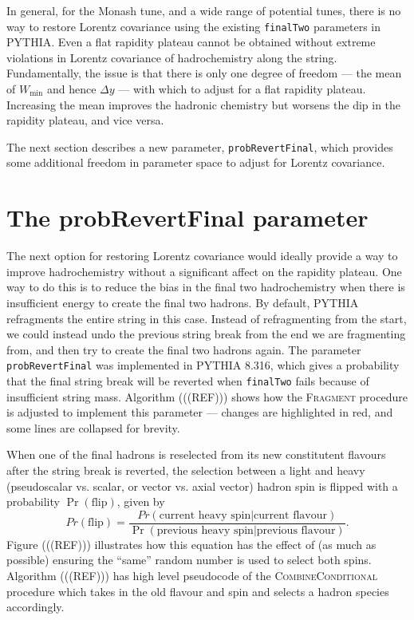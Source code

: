 \documentclass[12pt,a4paper]{report}
\begin{document}
In general, for the Monash tune, and a wide range of potential tunes, there is no way to restore Lorentz covariance using the existing \texttt{finalTwo} parameters in PYTHIA. Even a flat rapidity plateau cannot be obtained without extreme violations in Lorentz covariance of hadrochemistry along the string. Fundamentally, the issue is that there is only one degree of freedom --- the mean of $W_\text{min}$ and hence $\Delta y$ --- with which to adjust for a flat rapidity plateau. Increasing the mean improves the hadronic chemistry but worsens the dip in the rapidity plateau, and vice versa.

The next section describes a new parameter, \texttt{probRevertFinal}, which provides some additional freedom in parameter space to adjust for Lorentz covariance.

\section{The probRevertFinal parameter}
The next option for restoring Lorentz covariance would ideally provide a way to improve hadrochemistry without a significant affect on the rapidity plateau. One way to do this is to reduce the bias in the final two hadrochemistry when there is insufficient energy to create the final two hadrons. By default, PYTHIA refragments the entire string in this case. Instead of refragmenting from the start, we could instead undo the previous string break from the end we are fragmenting from, and then try to create the final two hadrons again. The parameter \texttt{probRevertFinal} was implemented in PYTHIA 8.316, which gives a probability that the final string break will be reverted when \texttt{finalTwo} fails because of insufficient string mass. Algorithm (((REF))) shows how the \textsc{Fragment} procedure is adjusted to implement this parameter --- changes are highlighted in red, and some lines are collapsed for brevity.

When one of the final hadrons is reselected from its new constitutent flavours after the string break is reverted, the selection between a light and heavy (pseudoscalar vs. scalar, or vector vs. axial vector) hadron spin is flipped with a probability $\Pr(\text{flip})$, given by
\begin{equation}
  Pr(\text{flip}) = \frac{Pr(\text{current heavy spin} | \text{current flavour})}{\Pr(\text{previous heavy spin} | \text{previous flavour})}.
\end{equation}
Figure (((REF))) illustrates how this equation has the effect of (as much as possible) ensuring the ``same'' random number is used to select both spins. Algorithm (((REF))) has high level pseudocode of the \textsc{CombineConditional} procedure which takes in the old flavour and spin and selects a hadron species accordingly.
\end{document}
